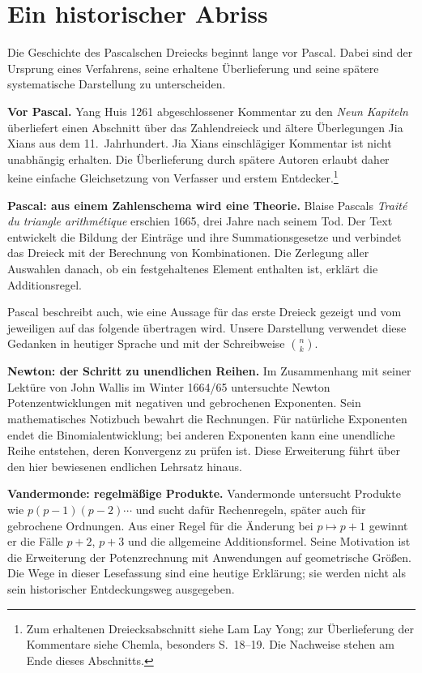 \clearpage
\section{Ein historischer Abriss}
\label{bin:history}

Die Geschichte des Pascalschen Dreiecks beginnt lange vor Pascal.
Dabei sind der Ursprung eines Verfahrens, seine erhaltene Überlieferung
und seine spätere systematische Darstellung zu unterscheiden.

\textbf{Vor Pascal.}
Yang Huis 1261 abgeschlossener Kommentar zu den \emph{Neun Kapiteln}
überliefert einen Abschnitt über das Zahlendreieck und ältere
Überlegungen Jia Xians aus dem 11.~Jahrhundert. Jia Xians einschlägiger
Kommentar ist nicht unabhängig erhalten. Die Überlieferung durch
spätere Autoren erlaubt daher keine einfache Gleichsetzung von
Verfasser und erstem Entdecker.\footnote{Zum erhaltenen Dreiecksabschnitt siehe Lam Lay Yong;
zur Überlieferung der Kommentare siehe Chemla, besonders S.~18--19.
Die Nachweise stehen am Ende dieses Abschnitts.}

\textbf{Pascal: aus einem Zahlenschema wird eine Theorie.}
Blaise Pascals \emph{Traité du triangle arithmétique} erschien 1665,
drei Jahre nach seinem Tod. Der Text entwickelt die Bildung der
Einträge und ihre Summationsgesetze und verbindet das Dreieck mit der
Berechnung von Kombinationen. Die Zerlegung aller Auswahlen danach,
ob ein festgehaltenes Element enthalten ist, erklärt die Additionsregel.

Pascal beschreibt auch, wie eine Aussage für das erste Dreieck gezeigt
und vom jeweiligen auf das folgende übertragen wird. Unsere Darstellung
verwendet diese Gedanken in heutiger Sprache und mit der Schreibweise
$\binom nk$.

\textbf{Newton: der Schritt zu unendlichen Reihen.}
Im Zusammenhang mit seiner Lektüre von John Wallis im Winter 1664/65
untersuchte Newton Potenzentwicklungen mit negativen und gebrochenen
Exponenten. Sein
mathematisches Notizbuch bewahrt die Rechnungen. Für natürliche
Exponenten endet die Binomialentwicklung; bei anderen Exponenten
kann eine unendliche Reihe entstehen, deren Konvergenz zu prüfen ist.
Diese Erweiterung führt über den hier bewiesenen endlichen Lehrsatz hinaus.

\textbf{Vandermonde: regelmäßige Produkte.}
Vandermonde untersucht Produkte wie $p(p-1)(p-2)\cdots$ und sucht
dafür Rechenregeln, später auch für gebrochene Ordnungen. Aus einer
Regel für die Änderung bei $p\mapsto p+1$ gewinnt er die Fälle
$p+2$, $p+3$ und die allgemeine Additionsformel. Seine Motivation
ist die Erweiterung der Potenzrechnung mit Anwendungen auf geometrische
Größen. Die Wege in dieser Lesefassung sind eine heutige Erklärung;
sie werden nicht als sein historischer Entdeckungsweg ausgegeben.

